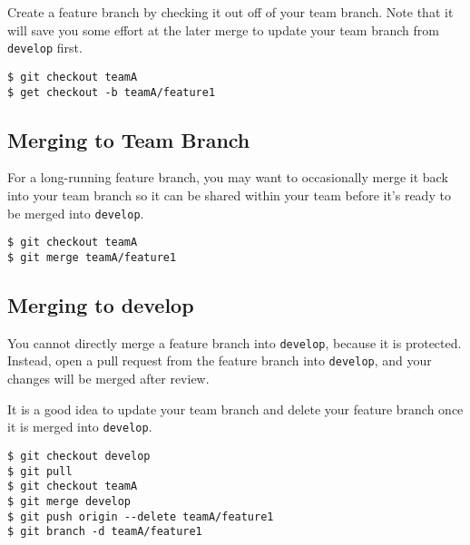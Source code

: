 Create a feature branch by checking it out off of your team branch. Note
that it will save you some effort at the later merge to update your team
branch from \texttt{develop} first.

\begin{verbatim}
$ git checkout teamA
$ get checkout -b teamA/feature1
\end{verbatim}

\subsection{Merging to Team Branch}\label{merging-to-team-branch}

For a long-running feature branch, you may want to occasionally merge it
back into your team branch so it can be shared within your team before
it's ready to be merged into \texttt{develop}.

\begin{verbatim}
$ git checkout teamA
$ git merge teamA/feature1
\end{verbatim}

\subsection{Merging to develop}\label{merging-to-develop}

You cannot directly merge a feature branch into \texttt{develop},
because it is protected. Instead, open a pull request from the feature
branch into \texttt{develop}, and your changes will be merged after
review.

It is a good idea to update your team branch and delete your feature
branch once it is merged into \texttt{develop}.

\begin{verbatim}
$ git checkout develop
$ git pull
$ git checkout teamA
$ git merge develop
$ git push origin --delete teamA/feature1
$ git branch -d teamA/feature1
\end{verbatim}
